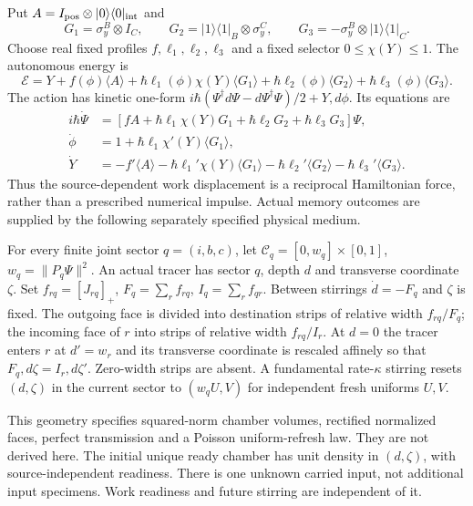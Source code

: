\documentclass[11pt,oneside,openany]{book}
\theoremstyle{definition}
\theoremstyle{remark}\newtheorem{remark}[theorem]{Remark}
\begin{document}
Put $A=I_{\rm pos}\otimes\lvert0\rangle\langle0\rvert_{\rm int}$ and
\[
 G_1=\sigma_y^B\otimes I_C,\qquad
 G_2=\lvert1\rangle\langle1\rvert_B\otimes\sigma_y^C,\qquad
 G_3=-\sigma_y^B\otimes\lvert1\rangle\langle1\rvert_C.
\]
Choose real fixed profiles $f,\ell_1,\ell_2,\ell_3$ and a fixed selector
$0\le\chi(Y)\le1$. The autonomous energy is
\begin{equation}
 \mathcal E=Y+f(\phi)\langle A\rangle+
 \hbar\ell_1(\phi)\chi(Y)\langle G_1\rangle+
 \hbar\ell_2(\phi)\langle G_2\rangle+
 \hbar\ell_3(\phi)\langle G_3\rangle.
 \label{acc:rotorenergy}
\end{equation}
The action has kinetic one-form
$i\hbar(\Psi^\dagger d\Psi-d\Psi^\dagger\Psi)/2+Y,d\phi$.
Its equations are
\begin{align}
 i\hbar\dot\Psi&=[fA+\hbar\ell_1\chi(Y)G_1+
 \hbar\ell_2G_2+\hbar\ell_3G_3]\Psi,\label{acc:rotorwave}\\
 \dot\phi&=1+\hbar\ell_1\chi'(Y)\langle G_1\rangle,\nonumber\\
 \dot Y&=-f'\langle A\rangle-\hbar\ell_1'\chi(Y)\langle G_1\rangle
 -\hbar\ell_2'\langle G_2\rangle-\hbar\ell_3'\langle G_3\rangle.
 \label{acc:rotorforce}
\end{align}
Thus the source-dependent work displacement is a reciprocal Hamiltonian
force, rather than a prescribed numerical impulse. Actual memory outcomes
are supplied by the following separately specified physical medium.

For every finite joint sector $q=(i,b,c)$, let
$\mathcal C_q=[0,w_q]\times[0,1]$, $w_q=\|P_q\Psi\|^2$.
An actual tracer has sector $q$, depth $d$ and transverse coordinate
$\zeta$. Set $f_{rq}=[J_{rq}]_+$,
$F_q=\sum_rf_{rq}$, $I_q=\sum_rf_{qr}$.
Between stirrings $\dot d=-F_q$ and $\zeta$ is fixed. The outgoing face
is divided into destination strips of relative width $f_{rq}/F_q$;
the incoming face of $r$ into strips of relative width $f_{rq}/I_r$.
At $d=0$ the tracer enters $r$ at $d'=w_r$ and its transverse coordinate
is rescaled affinely so that
$F_q,d\zeta=I_r,d\zeta'$. Zero-width strips are absent.
A fundamental rate-$\kappa$ stirring resets $(d,\zeta)$ in the current
sector to $(w_qU,V)$ for independent fresh uniforms $U,V$.

This geometry specifies squared-norm chamber volumes, rectified normalized
faces, perfect transmission and a Poisson uniform-refresh law. They are
not derived here. The initial unique ready chamber has unit density in
$(d,\zeta)$, with source-independent readiness. There is one unknown
carried input, not additional input specimens. Work readiness and future
stirring are independent of it.
\end{document}
